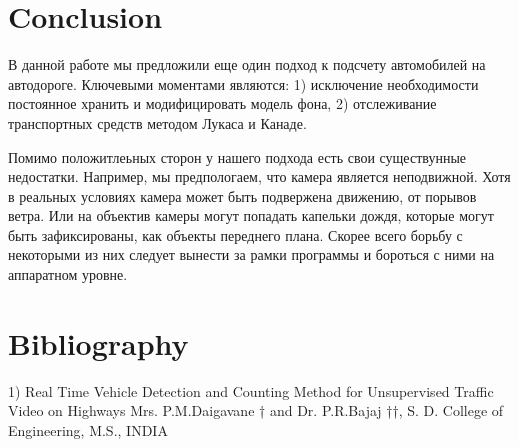 \documentclass[12pt,a4paper,oneside,titlepage]{article}
\begin{document}
\newpage
\section{Conclusion}
В данной работе мы предложили еще один подход к подсчету автомобилей на автодороге.
Ключевыми моментами являются:
1) исключение необходимости постоянное хранить и модифицировать модель фона,
2) отслеживание транспортных средств методом Лукаса и Канаде.

Помимо положитлеьных сторон у нашего подхода есть свои существунные недостатки.
Например, мы предпологаем, что камера является неподвижной.
Хотя в реальных условиях камера может быть подвержена движению, от порывов ветра.
Или на объектив камеры могут попадать капельки дождя, которые могут быть зафиксированы, как объекты переднего плана.
Скорее всего борьбу с некоторыми из них следует вынести за рамки программы и бороться с ними на аппаратном уровне.



\newpage
\section{Bibliography}
1) Real Time Vehicle Detection and Counting Method for Unsupervised Traffic Video on Highways
Mrs. P.M.Daigavane † and Dr. P.R.Bajaj ††,
S. D. College of Engineering, M.S., INDIA
\end{document}
